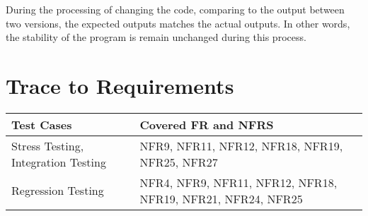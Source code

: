 \documentclass[12pt, titlepage]{article}
\begin{document}
\noindent During the processing of changing the code, comparing to the output between two versions, the expected outputs matches the actual outputs. In other words, the stability of the program is remain unchanged during this process.
		
\section{Trace to Requirements}

\begin{tabular}{| m{5cm} | m{5cm}|}
    \hline
    \textbf{Test Cases} & \textbf{Covered FR and NFRS} \\
    \hline
     Stress Testing, Integration Testing & NFR9, NFR11, NFR12, NFR18, NFR19, NFR25, NFR27  \\
     \hline
     Regression Testing & NFR4, NFR9, NFR11, NFR12, NFR18, NFR19, NFR21, NFR24, NFR25\\
     \hline
\end{tabular}
\end{document}
